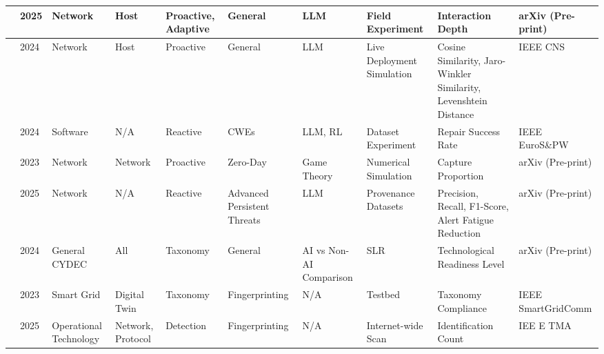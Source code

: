 \begin{landscape}
\begin{longtable}{|p{0.6cm}|p{0.8cm}|p{2.6cm}|p{2.2cm}|p{2.8cm}|p{2.5cm}|p{2cm}|p{2.5cm}|p{2.8cm}|p{3.8cm}|}
            \cite{honeygpt2025}           & 2025          & Network                  & Host                & Proactive, Adaptive           & General                     & LLM                     & Field Experiment           & Interaction Depth                                                & arXiv (Pre-print)                      \\ \hline
            \cite{llmhoneypot2024}        & 2024          & Network                  & Host                & Proactive                     & General                     & LLM                     & Live Deployment Simulation & Cosine Similarity, Jaro-Winkler Similarity, Levenshtein Distance & IEEE CNS                               \\ \hline
            \cite{shellm2024}             & 2024          & Software                 & N/A                 & Reactive                      & CWEs                        & LLM, RL                 & Dataset Experiment         & Repair Success Rate                                              & IEEE EuroS\&PW                         \\ \hline
            \cite{zerodaydeception2023}   & 2023          & Network                  & Network             & Proactive                     & Zero-Day                    & Game Theory             & Numerical Simulation       & Capture Proportion                                               & arXiv (Pre-print)                      \\ \hline
            \cite{shieldapt2025}          & 2025          & Network                  & N/A                 & Reactive                      & Advanced Persistent Threats & LLM                     & Provenance Datasets        & Precision, Recall, F1-Score, Alert Fatigue Reduction             & arXiv (Pre-print)                      \\ \hline
            \cite{deceptiontrends2024}    & 2024          & General CYDEC            & All                 & Taxonomy                      & General                     & AI vs Non-AI Comparison & SLR                        & Technological Readiness Level                                    & arXiv (Pre-print)                      \\ \hline
            \cite{sgfingerprint2023}      & 2023          & Smart Grid               & Digital Twin        & Taxonomy                      & Fingerprinting              & N/A                     & Testbed                    & Taxonomy Compliance                                              & IEEE SmartGridComm                     \\ \hline
            \cite{otfingerprint2025}      & 2025          & Operational Technology   & Network, Protocol   & Detection                     & Fingerprinting              & N/A                     & Internet-wide Scan         & Identification Count                                             & IEE  E TMA                             \\ \hline
      \end{longtable}
\end{landscape}